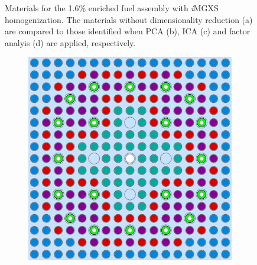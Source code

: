 \begin{appendices}
\begin{figure}[h!]
\begin{subfigure}{0.48\textwidth}
  \caption{}
  \label{fig:assm-16-combined-factor-analysis-2}
\end{subfigure}
\caption[Clustered geometries with dimensionality reduction]{Materials for the 1.6\% enriched fuel assembly with \textit{i}\ac{MGXS} homogenization. The materials without dimensionality reduction (a) are compared to those identified when PCA (b), ICA (c) and factor analyis (d) are applied, respectively.}
\label{fig:dimension-reduce-assm-16-geometries}
\end{figure}

\clearpage

\begin{figure}[h!]
\centering
\begin{subfigure}{0.48\textwidth}
  \centering
  \includegraphics[width=0.95\linewidth]{figures/unsupervised/geometries/dimension-reduce/assm-31-20BPs/no-reduce}
  \caption{}
  \label{fig:assm-31-20BPs-combined-no-reduce}
\end{subfigure}%
\begin{subfigure}{0.48\textwidth}
  \centering

\end{subfigure}
\end{figure}
\end{appendices}
